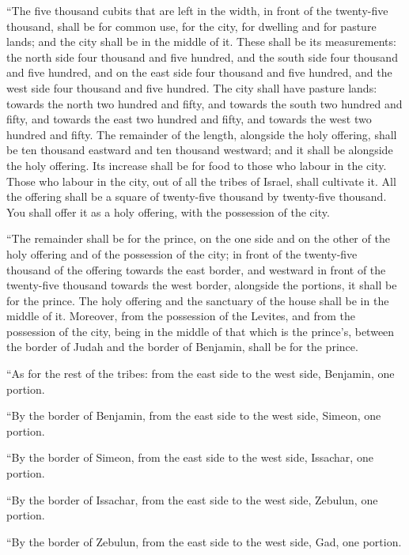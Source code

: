  ``The five thousand cubits that are left in the width, in
front of the twenty-five thousand, shall be for common use, for the
city, for dwelling and for pasture lands; and the city shall be in the
middle of it.  These shall be its measurements: the north
side four thousand and five hundred, and the south side four thousand
and five hundred, and on the east side four thousand and five hundred,
and the west side four thousand and five hundred.  The city
shall have pasture lands: towards the north two hundred and fifty, and
towards the south two hundred and fifty, and towards the east two
hundred and fifty, and towards the west two hundred and fifty.
 The remainder of the length, alongside the holy offering,
shall be ten thousand eastward and ten thousand westward; and it shall
be alongside the holy offering. Its increase shall be for food to those
who labour in the city.  Those who labour in the city, out
of all the tribes of Israel, shall cultivate it.  All the
offering shall be a square of twenty-five thousand by twenty-five
thousand. You shall offer it as a holy offering, with the possession of
the city.

 ``The remainder shall be for the prince, on the one side
and on the other of the holy offering and of the possession of the city;
in front of the twenty-five thousand of the offering towards the east
border, and westward in front of the twenty-five thousand towards the
west border, alongside the portions, it shall be for the prince. The
holy offering and the sanctuary of the house shall be in the middle of
it.  Moreover, from the possession of the Levites, and from
the possession of the city, being in the middle of that which is the
prince's, between the border of Judah and the border of Benjamin, shall
be for the prince.

 ``As for the rest of the tribes: from the east side to the
west side, Benjamin, one portion.

 ``By the border of Benjamin, from the east side to the
west side, Simeon, one portion.

 ``By the border of Simeon, from the east side to the west
side, Issachar, one portion.

 ``By the border of Issachar, from the east side to the
west side, Zebulun, one portion.

 ``By the border of Zebulun, from the east side to the west
side, Gad, one portion.

